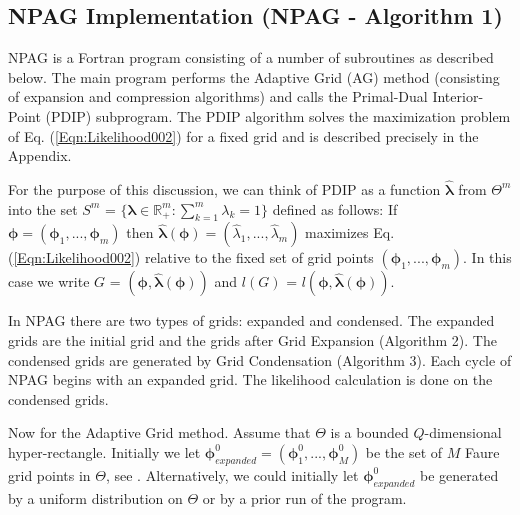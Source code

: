 %
%

\subsection{NPAG Implementation (NPAG - Algorithm 1)}
\label{NPAG}

NPAG is a Fortran program consisting of a number of subroutines as described below.
%
The main program performs the Adaptive Grid (AG) method (consisting of expansion and compression algorithms) and calls the Primal-Dual Interior-Point (PDIP) subprogram.
The PDIP algorithm solves the maximization problem  of Eq. (\ref{Eqn:Likelihood002}) for a fixed grid and is  described precisely in the Appendix. 

For the purpose of this discussion, we can think of PDIP as a function  $\bm{\hat{\lambda}}$ from $\Theta^m$ into the set $S^m$ = $\{\bm{\lambda}  \in \mathbb{R}_{+}^{m}:  \sum_{k=1}^m  \lambda_k = 1 \}$
defined as follows:
%
If  $\bm{\phi} = (\bm{\phi}_1, ... , \bm{\phi}_m)$ then $\bm{\hat{\lambda}}(\bm{\phi})= (\hat{\lambda}_1, ... ,\hat\lambda_m)$
maximizes Eq. (\ref{Eqn:Likelihood002})  relative to the fixed set of grid points $(\bm{\phi}_1, ... , \bm{\phi}_m)$. 
In this case we write  $G$ = $(\bm{\phi},\bm{\hat{\lambda}}(\bm{\phi}))$  and  $l(G)$ = $l(\bm{\phi}, \bm{\hat{\lambda}}(\bm{\phi}))$.

In NPAG there are two types of grids: expanded and condensed. The expanded grids are the initial grid and the grids after Grid Expansion (Algorithm 2).
The condensed grids are generated by Grid Condensation (Algorithm 3). %
Each cycle of NPAG begins with an expanded grid. The likelihood calculation is done on the condensed grids.

Now for the Adaptive Grid method.
%
Assume that $ \Theta$  is  a bounded $Q$-dimensional hyper-rectangle.
%
Initially we let  $\bm{\phi}^{0}_{expanded} = (\bm{\phi}^{0}_1, ... , \bm{\phi}^{0}_M)$ be the set of $M$ Faure grid points in $\Theta$, see
\cite{FaureSequence, InitFaureSequence, DoFaureSequence}.
%
Alternatively, we could initially let $\bm{\phi}^0_{expanded}$ be generated by a uniform distribution on  $\Theta$ or by a prior run of the program.

